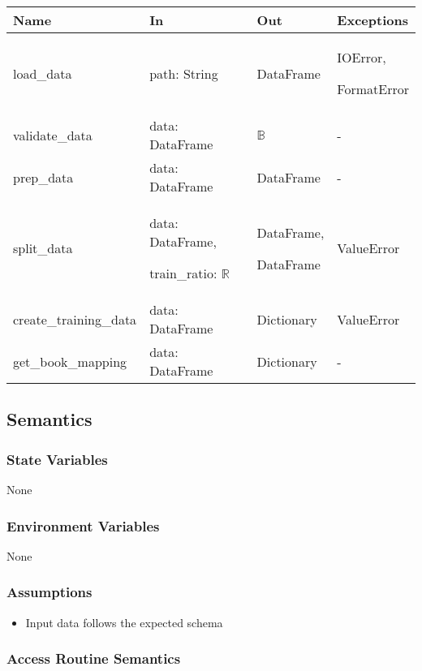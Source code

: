 \documentclass[12pt, titlepage]{article}
\begin{document}
\begin{center}
  \begin{tabular}{p{4cm} p{4cm} p{4cm} p{2cm}}
  \hline
  \textbf{Name} & \textbf{In} & \textbf{Out} & \textbf{Exceptions} \\
  \hline
  load\_data & path: String &  DataFrame & IOError,
  
  FormatError\\
  \hline
  validate\_data & data: DataFrame &  $\mathbb{B}$ & -\\
  \hline
  prep\_data & data: DataFrame &  DataFrame & - \\
  \hline
  split\_data & data: DataFrame,
  
  train\_ratio: $\mathbb{R}$ &  DataFrame,
  
  DataFrame & ValueError \\
  \hline
  create\_training\_data & data: DataFrame & Dictionary & ValueError \\
  \hline
  get\_book\_mapping & data: DataFrame & Dictionary & - \\
  \hline
  \end{tabular}
  \end{center}


\subsection{Semantics}

\subsubsection{State Variables}
None

\subsubsection{Environment Variables}

None

\subsubsection{Assumptions}

\begin{itemize}
  \item Input data follows the expected schema
\end{itemize}
\subsubsection{Access Routine Semantics}
\end{document}
